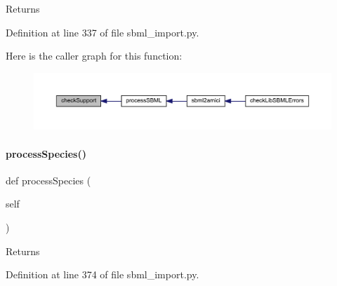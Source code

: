\begin{DoxyReturn}{Returns}

\end{DoxyReturn}


Definition at line 337 of file sbml\+\_\+import.\+py.

Here is the caller graph for this function\+:
\nopagebreak
\begin{figure}[H]
\begin{center}
\leavevmode
\includegraphics[width=350pt]{classamici_1_1sbml__import_1_1_sbml_importer_ae9585f937c02f0618abeb06dd48bcd54_icgraph}
\end{center}
\end{figure}
\mbox{\label{classamici_1_1sbml__import_1_1_sbml_importer_a4912a89bf86ec8e0c1d9758b8090e327}} 
\paragraph{\texorpdfstring{process\+Species()}{processSpecies()}}
{\footnotesize\ttfamily def process\+Species (\begin{DoxyParamCaption}\item[{}]{self }\end{DoxyParamCaption})}

\begin{DoxyReturn}{Returns}

\end{DoxyReturn}


Definition at line 374 of file sbml\+\_\+import.\+py.

